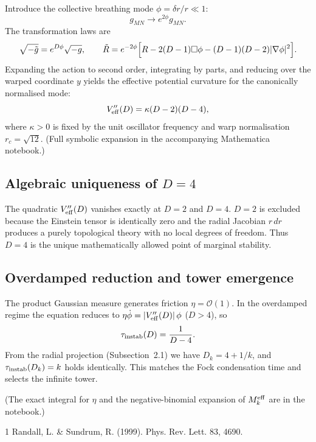 \documentclass[11pt,a4paper,oneside]{article}
\begin{document}
Introduce the collective breathing mode \(\phi = \delta r/r \ll 1\):
\[
g_{MN} \to e^{2\phi} g_{MN}.
\]
The transformation laws are
\[
\sqrt{-\tilde{g}} = e^{D\phi}\sqrt{-g}, \qquad
\tilde{R} = e^{-2\phi}\Bigl[R - 2(D-1)\square\phi - (D-1)(D-2)|\nabla\phi|^2\Bigr].
\]
Expanding the action to second order, integrating by parts, and reducing over the warped coordinate \(y\) yields the effective potential curvature for the canonically normalised mode:
\[
V''_{\rm eff}(D) = \kappa (D-2)(D-4),
\]
where \(\kappa > 0\) is fixed by the unit oscillator frequency and warp normalisation \(r_c = \sqrt{12}\). (Full symbolic expansion in the accompanying Mathematica notebook.)

\subsection{Algebraic uniqueness of \(D=4\)}

The quadratic \(V''_{\rm eff}(D)\) vanishes exactly at \(D=2\) and \(D=4\). \(D=2\) is excluded because the Einstein tensor is identically zero and the radial Jacobian \(r\,dr\) produces a purely topological theory with no local degrees of freedom. Thus \(D=4\) is the unique mathematically allowed point of marginal stability.

\subsection{Overdamped reduction and tower emergence}

The product Gaussian measure generates friction \(\eta = \mathcal{O}(1)\). In the overdamped regime the equation reduces to \(\eta\dot{\phi} = |V''_{\rm eff}(D)|\,\phi\) (\(D>4\)), so
\[
\tau_{\rm instab}(D) = \frac{1}{D-4}.
\]
From the radial projection (Subsection~2.1) we have \(D_k = 4 + 1/k\), and \(\tau_{\rm instab}(D_k) = k\) holds identically. This matches the Fock condensation time and selects the infinite tower.

(The exact integral for \(\eta\) and the negative-binomial expansion of \(M_k^{\rm eff}\) are in the notebook.)


\begin{thebibliography}{1}
 Randall, L. \& Sundrum, R. (1999). Phys. Rev. Lett. 83, 4690.
\end{thebibliography}
\end{document}
